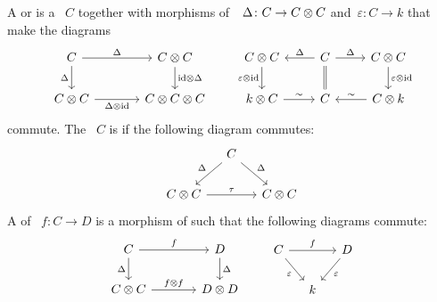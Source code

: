 \documentclass[a4paper,10pt,headings=standardclasses]{scrartcl}
\begin{document}
\begin{definition}
  A  or  is a {\dgv}~$C$ together with morphisms of~{\dgv}~$\Delta \colon C \to C \otimes C$ and~$\varepsilon \colon C \to k$ that make the diagrams
  \[
    \begin{tikzcd}[column sep = large]
      C
      \arrow{r}[above]{\Delta}
      \arrow{d}[left]{\Delta}
      &
      C \tensor C
      \arrow{d}[right]{{\id} \tensor \Delta}
      \\
      C \tensor C
      \arrow{r}[below]{\Delta \tensor {\id}}
      &
      C \tensor C \tensor C
    \end{tikzcd}
    \qquad
    \begin{tikzcd}
      C \tensor C
      \arrow{d}[left]{\varepsilon \tensor {\id}}
      &
      C
      \arrow{l}[above]{\Delta}
      \arrow[equal]{d}
      \arrow{r}[above]{\Delta}
      &
      C \tensor C
      \arrow{d}[right]{\varepsilon \tensor {\id}}
      \\
      k \tensor C
      \arrow{r}[above]{\sim}
      &
      C
      &
      C \tensor k
      \arrow{l}[above]{\sim}
    \end{tikzcd}
  \]
  commute.
  The {\dgc}~$C$ is  if the following diagram commutes:
  \[
    \begin{tikzcd}[column sep = small]
      {}
      &
      C
      \arrow{dl}[above left]{\Delta}
      \arrow{dr}[above right]{\Delta}
      &
      {}
      \\
      C \tensor C
      \arrow{rr}[above]{\tau}
      &
      {}
      &
      C \tensor C
    \end{tikzcd}
  \]
  A  of {\dgc}~$f \colon C \to D$ is a morphism of {\dgvs} such that the following diagrams commute:
  \[
    \begin{tikzcd}[column sep = large]
      C
      \arrow{r}[above]{f}
      \arrow{d}[left]{\Delta}
      &
      D
      \arrow{d}[right]{\Delta}
      \\
      C \tensor C
      \arrow{r}[above]{f \tensor f}
      &
      D \tensor D
    \end{tikzcd}
    \qquad
    \begin{tikzcd}[column sep = small]
      C
      \arrow{rr}[above]{f}
      \arrow{dr}[below left]{\varepsilon}
      &
      {}
      &
      D
      \arrow{dl}[below right]{\varepsilon}
      \\
      {}
      &
      k
      &
      {}
    \end{tikzcd}
  \]
\end{definition}
\end{document}
